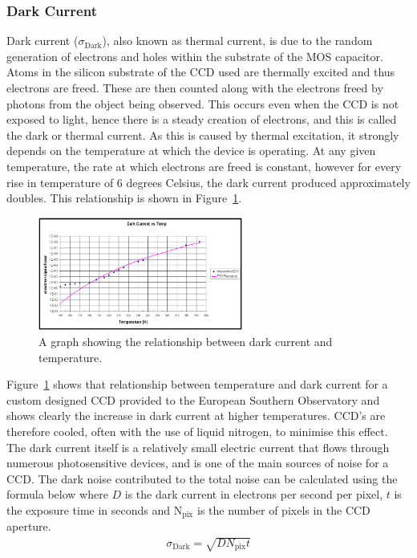 		\subsubsection{Dark Current} %
		\label{ssub:dark_current}
			Dark current ($\sigma_\text{Dark}$), also known as thermal current, is due to the random generation of electrons and holes within the substrate of the MOS capacitor. Atoms in the silicon substrate of the CCD used are thermally excited and thus electrons are freed. These are then counted along with the electrons freed by photons from the object being observed. This occurs even when the CCD is not exposed to light, hence there is a steady creation of electrons, and this is called the dark or thermal current. As this is caused by thermal excitation, it strongly depends on the temperature at which the device is operating. At any given temperature, the rate at which electrons are freed is constant, however for every rise in temperature of 6 degrees Celsius, the dark current produced approximately doubles\cite{Astronomical_Image_Processing}. This relationship is shown in Figure~\ref{fig:dark_current_vs_temp}\cite{Southern_Observatory_throughput}.
			\begin{figure}[!htbp]
				\centering
				\includegraphics[width=0.6\textwidth]{../Images/Dark.png}
				\caption{A graph showing the relationship between dark current and temperature.\label{fig:dark_current_vs_temp}}
			\end{figure}

			Figure~\ref{fig:dark_current_vs_temp} shows that relationship between temperature and dark current for a custom designed CCD provided to the European Southern Observatory and shows clearly the increase in dark current at higher temperatures. CCD's are therefore cooled, often with the use of liquid nitrogen, to minimise this effect. The dark current itself is a relatively small electric current that flows through numerous photosensitive devices, and is one of the main sources of noise for a CCD. The dark noise contributed to the total noise can be calculated using the formula below where $D$ is the dark current in electrons per second per pixel, $t$ is the exposure time in seconds and N$_\text{pix}$ is the number of pixels in the CCD aperture.
			\begin{align}
				\sigma_\text{Dark} = \sqrt{DN_\text{pix}t}
			\end{align}

